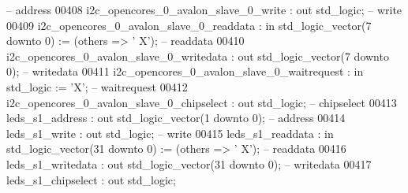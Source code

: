\begin{DoxyCode}
           \textcolor{keyword}{-- address}
00408             i2c\_opencores\_0\_avalon\_slave\_0\_write        : \textcolor{keywordflow}{out} \textcolor{comment}{std\_logic};                                   
           \textcolor{keyword}{-- write}
00409             i2c\_opencores\_0\_avalon\_slave\_0\_readdata     : \textcolor{keywordflow}{in}  \textcolor{comment}{std\_logic\_vector}(\textcolor{vhdllogic}{}\textcolor{vhdllogic}{7} \textcolor{keywordflow}{downto} \textcolor{vhdllogic}{}\textcolor{vhdllogic}{0})  := (\textcolor{keywordflow}{others} => '
      X'); \textcolor{keyword}{-- readdata}
00410             i2c\_opencores\_0\_avalon\_slave\_0\_writedata    : \textcolor{keywordflow}{out} \textcolor{comment}{std\_logic\_vector}(\textcolor{vhdllogic}{}\textcolor{vhdllogic}{7} \textcolor{keywordflow}{downto} \textcolor{vhdllogic}{}\textcolor{vhdllogic}{0});                
           \textcolor{keyword}{-- writedata}
00411             i2c\_opencores\_0\_avalon\_slave\_0\_waitrequest  : \textcolor{keywordflow}{in}  \textcolor{comment}{std\_logic}                     := 'X';        
           \textcolor{keyword}{-- waitrequest}
00412             i2c\_opencores\_0\_avalon\_slave\_0\_chipselect   : \textcolor{keywordflow}{out} \textcolor{comment}{std\_logic};                                   
           \textcolor{keyword}{-- chipselect}
00413             leds\_s1\_address                             : \textcolor{keywordflow}{out} \textcolor{comment}{std\_logic\_vector}(\textcolor{vhdllogic}{}\textcolor{vhdllogic}{1} \textcolor{keywordflow}{downto} \textcolor{vhdllogic}{}\textcolor{vhdllogic}{0});                
           \textcolor{keyword}{-- address}
00414             leds\_s1\_write                               : \textcolor{keywordflow}{out} \textcolor{comment}{std\_logic};                                   
           \textcolor{keyword}{-- write}
00415             leds\_s1\_readdata                            : \textcolor{keywordflow}{in}  \textcolor{comment}{std\_logic\_vector}(\textcolor{vhdllogic}{}\textcolor{vhdllogic}{31} \textcolor{keywordflow}{downto} \textcolor{vhdllogic}{}\textcolor{vhdllogic}{0}) := (\textcolor{keywordflow}{others} => '
      X'); \textcolor{keyword}{-- readdata}
00416             leds\_s1\_writedata                           : \textcolor{keywordflow}{out} \textcolor{comment}{std\_logic\_vector}(\textcolor{vhdllogic}{}\textcolor{vhdllogic}{31} \textcolor{keywordflow}{downto} \textcolor{vhdllogic}{}\textcolor{vhdllogic}{0});               
           \textcolor{keyword}{-- writedata}
00417             leds\_s1\_chipselect                          : \textcolor{keywordflow}{out} \textcolor{comment}{std\_logic};                                   

\end{DoxyCode}
